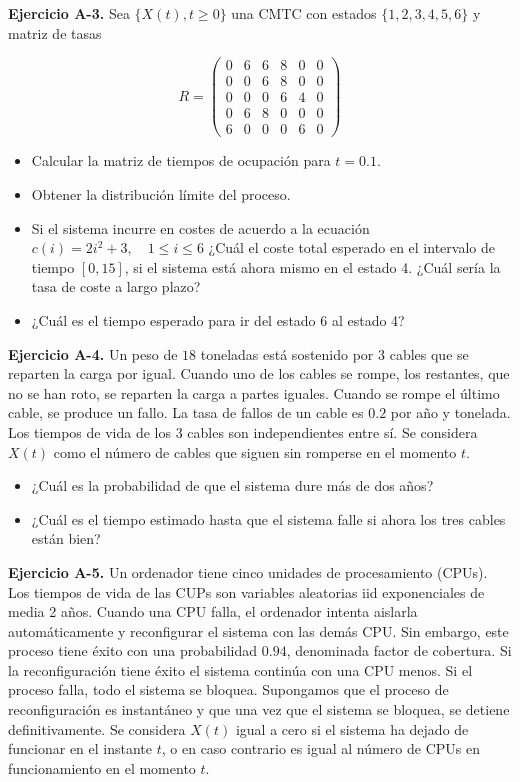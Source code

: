 \documentclass[
]{book}
\providecommand{\tightlist}{%
  \setlength{\itemsep}{0pt}\setlength{\parskip}{0pt}}
\theoremstyle{definition}
\theoremstyle{definition}
\theoremstyle{definition}
\theoremstyle{definition}
\theoremstyle{remark}
\begin{document}
\textbf{Ejercicio A-3.} Sea \(\{X(t), t \geq 0\}\) una CMTC con estados \(\{1, 2, 3, 4, 5, 6\}\) y matriz de tasas

\[
R = \begin{pmatrix}
0 & 6 & 6 & 8 & 0 & 0\\
0 & 0 & 6 & 8 & 0 & 0\\
0 & 0 & 0 & 6 & 4 & 0\\
0 & 6 & 8  & 0 & 0 & 0\\
6 & 0& 0& 0& 6 & 0
\end{pmatrix}
\]

\begin{itemize}
\tightlist
\item
  Calcular la matriz de tiempos de ocupación para \(t=0.1\).
\item
  Obtener la distribución límite del proceso.
\item
  Si el sistema incurre en costes de acuerdo a la ecuación \(c(i) = 2i^2+3, \quad 1\leq i\leq 6\) ¿Cuál el coste total esperado en el intervalo de tiempo \([0, 15]\), si el sistema está ahora mismo en el estado 4. ¿Cuál sería la tasa de coste a largo plazo?
\item
  ¿Cuál es el tiempo esperado para ir del estado 6 al estado 4?
\end{itemize}

\textbf{Ejercicio A-4.} Un peso de \(18\) toneladas está sostenido por \(3\) cables que se reparten la carga por igual. Cuando uno de los cables se rompe, los restantes, que no se han roto, se reparten la carga a partes iguales. Cuando se rompe el último cable, se produce un fallo. La tasa de fallos de un cable es \(0.2\) por año y tonelada. Los tiempos de vida de los \(3\) cables son independientes entre sí. Se considera \(X(t)\) como el número de cables que siguen sin romperse en el momento \(t\).

\begin{itemize}
\tightlist
\item
  ¿Cuál es la probabilidad de que el sistema dure más de dos años?
\item
  ¿Cuál es el tiempo estimado hasta que el sistema falle si ahora los tres cables están bien?
\end{itemize}

\textbf{Ejercicio A-5.} Un ordenador tiene cinco unidades de procesamiento (CPUs). Los tiempos de vida de las CUPs son variables aleatorias iid exponenciales de media 2 años. Cuando una CPU falla, el ordenador intenta aislarla automáticamente y reconfigurar el sistema con las demás CPU. Sin embargo, este proceso tiene éxito con una probabilidad \(0.94\), denominada factor de cobertura. Si la reconfiguración tiene éxito el sistema continúa con una CPU menos. Si el proceso falla, todo el sistema se bloquea. Supongamos que el proceso de reconfiguración es instantáneo y que una vez que el sistema se bloquea, se detiene definitivamente. Se considera \(X(t)\) igual a cero si el sistema ha dejado de funcionar en el instante \(t\), o en caso contrario es igual al número de CPUs en funcionamiento en el momento \(t\).
\end{document}
